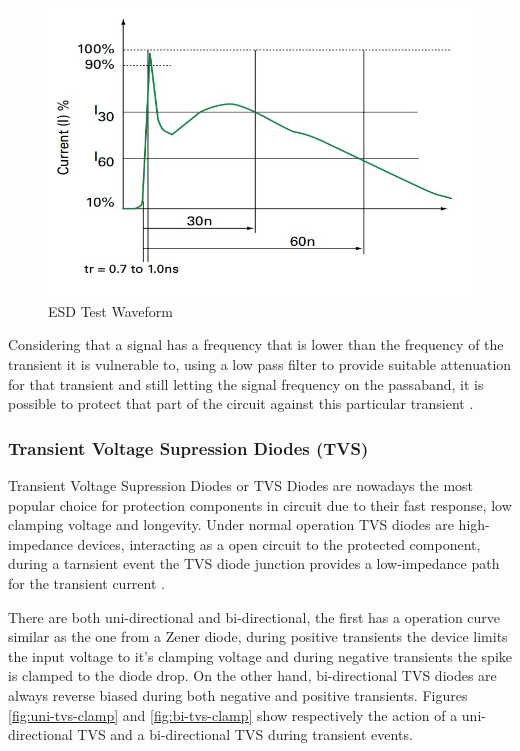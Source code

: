 		\begin{figure}[htbp]
			\centering
			\includegraphics[width=.8\textwidth]{figuras/fig-esd-test-waveform}
			\caption{ESD Test Waveform \cite{esd-test-waveform}}
			\label{fig:esd-test-waveform}
		\end{figure}

		Considering that a signal has a frequency that is lower than the frequency of the transient it is vulnerable to, using a low pass filter to provide suitable attenuation for that transient and still letting the signal frequency on the passaband, it is possible to protect that part of the circuit against this particular transient \cite{standler1988use}. 


	\subsubsection{Transient Voltage Supression Diodes (TVS)}\label{sssec:tvsTransientProtection}

		\label{ssssec:tvsOperation}
			Transient Voltage Supression Diodes or TVS Diodes are nowadays the most popular choice for protection components in circuit due to their fast response, low clamping voltage and longevity. Under normal operation TVS diodes are high-impedance devices, interacting as a open circuit to the protected component, during a tarnsient event the TVS diode junction provides a low-impedance path for the transient current \cite{renesasTVS}.
			\par
			There are both uni-directional and bi-directional, the first has a operation curve similar as the one from a Zener diode, during positive transients the device limits the input voltage to it's clamping voltage and during negative transients the spike is clamped to the diode drop. On the other hand, bi-directional TVS diodes are always reverse biased during both negative and positive transients. Figures \ref{fig:uni-tvs-clamp} and \ref{fig:bi-tvs-clamp} show respectively the action of a uni-directional TVS and a bi-directional TVS during transient events.

